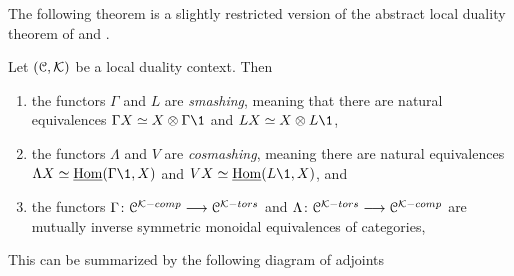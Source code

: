 The following theorem is a slightly restricted version of the abstract local duality theorem of \cite[3.3.5]{hovey-palmiery-strickland_97} and \cite[2.21]{barthel-heard-valenzuela_2018}.  

\begin{theorem}
    \label{ch1:thm:local-duality}
    Let $(\EuScript{C}, \mathcal{K})$ be a local duality context. Then
    \begin{enumerate}
        \item the functors $\Gamma$ and $L$ are \emph{smashing}, meaning that there are natural equivalences $\Gamma X\simeq X\otimes \Gamma \1$ and $LX\simeq X\otimes L\1$,
        \item the functors $\Lambda$ and $V$ are \emph{cosmashing}, meaning there are natural equivalences $\Lambda X\simeq \iHom(\Gamma \1,X)$ and $VX\simeq \iHom(L\1, X)$, and 
        \item the functors $\Gamma\colon \EuScript{C}^{\mathcal{K}-comp}\longrightarrow \EuScript{C}^{\mathcal{K}-tors}$ and $\Lambda\colon \EuScript{C}^{\mathcal{K}-tors}\longrightarrow \EuScript{C}^{\mathcal{K}-comp}$ are mutually inverse symmetric monoidal equivalences of categories,
    \end{enumerate}
    This can be summarized by the following diagram of adjoints
    \begin{center}
    \end{center}
\end{theorem}

